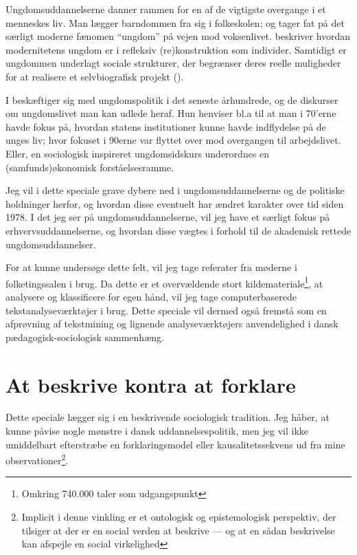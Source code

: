  Ungdomsuddannelserne danner rammen for en af de vigtigste overgange i et menneskes liv.
 Man lægger barndommen fra sig i folkeskolen; og tager fat på det særligt moderne fænomen “ungdom” på vejen mod voksenlivet.
 \citeauthor{juulDiskurserOmUngdom2013} beskriver hvordan modernitetens ungdom er i refleksiv (re)konstruktion som individer.
 Samtidigt er ungdommen underlagt sociale strukturer, der begrænser deres reelle muligheder for at realisere et selvbiografisk projekt (\citeyear[s. 11]{juulDiskurserOmUngdom2013}).

I  beskæftiger \citeauthor{juulDiskurserOmUngdom2013} sig med ungdomspolitik i det seneste århundrede, og de diskurser om ungdomslivet man kan udlede heraf.
Hun henviser bl.a til at man i 70'erne havde fokus på, hvordan statens institutioner kunne havde indflydelse på de unges liv; hvor fokuset i 90erne var flyttet over mod overgangen til arbejdslivet.
Eller, en sociologisk inspireret ungdomsidskurs underordnes en (samfunds)økonomisk forståelsesramme.

Jeg vil i dette speciale grave dybere ned i ungdomsuddannelserne og de politiske holdninger herfor, og hvordan disse eventuelt har ændret karakter over tid siden 1978.
I det jeg ser på ungdomsuddannelserne, vil jeg have et særligt fokus på erhvervsuddannelserne, og hvordan disse vægtes i forhold til de akademisk rettede ungdomsuddannelser.

For at kunne undersøge dette felt, vil jeg tage referater fra møderne i folketingssalen i brug.
Da dette er et overvældende stort kildemateriale\footnote{Omkring 740.000 taler som udgangspunkt}, at analysere og klassificere for egen hånd, vil jeg tage computerbaserede tekstanalyseværktøjer i brug.
Dette speciale vil dermed også fremstå som en afprøvning af tekstmining og lignende analyseværktøjers anvendelighed i dansk pædagogisk-sociologisk sammenhæng.

\section{At beskrive kontra at forklare}\label{sec:beskrive}

Dette speciale lægger sig i en beskrivende sociologisk tradition.
Jeg håber, at kunne påvise nogle mønstre i dansk uddannelsespolitik, men jeg vil ikke umiddelbart efterstræbe en forklaringsmodel eller kausalitetssekvens ud fra mine observationer\footnote{Implicit i denne vinkling er et ontologisk og epistemologisk perspektiv, der tilsiger at der er en social verden at beskrive — og at en sådan beskrivelse kan afspejle en social virkelighed}.

